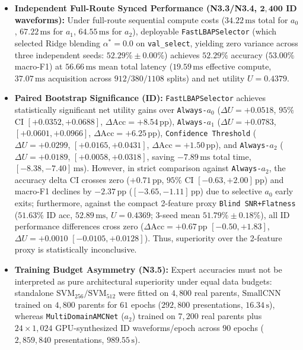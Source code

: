 \begin{itemize}
    \item \textbf{Independent Full-Route Synced Performance (N3.3/N3.4, $\mathbf{2{,}400}$ ID waveforms):} Under full-route sequential compute costs ($34.22\,\mathrm{ms}$ total for $a_0$, $67.22\,\mathrm{ms}$ for $a_1$, $64.55\,\mathrm{ms}$ for $a_2$), deployable \texttt{FastLBAPSelector} (which selected Ridge blending $\alpha^*=0.0$ on \texttt{val\_select}, yielding zero variance across three independent seeds: $52.29\% \pm 0.00\%$) achieves $\mathbf{52.29\%}$ accuracy ($53.00\%$ macro-F1) at $\mathbf{56.66\,\mathrm{ms}}$ mean total latency ($19.59\,\mathrm{ms}$ effective compute, $37.07\,\mathrm{ms}$ acquisition across $912/380/1108$ splits) and net utility $U = \mathbf{0.4379}$.
    \item \textbf{Paired Bootstrap Significance (ID):} \texttt{FastLBAPSelector} achieves statistically significant net utility gains over \texttt{Always-$a_0$} ($\Delta U = +0.0518$, $95\%$ CI $[+0.0352, +0.0688]$, $\Delta\mathrm{Acc} = +8.54\,\mathrm{pp}$), \texttt{Always-$a_1$} ($\Delta U = +0.0783$, $[+0.0601, +0.0966]$, $\Delta\mathrm{Acc} = +6.25\,\mathrm{pp}$), \texttt{Confidence Threshold} ($\Delta U = +0.0299$, $[+0.0165, +0.0431]$, $\Delta\mathrm{Acc} = +1.50\,\mathrm{pp}$), and \texttt{Always-$a_2$} ($\Delta U = +0.0189$, $[+0.0058, +0.0318]$, saving $-7.89\,\mathrm{ms}$ total time, $[-8.38, -7.40]\,\mathrm{ms}$). However, in strict comparison against \texttt{Always-$a_2$}, the accuracy delta CI crosses zero ($+0.71\,\mathrm{pp}$, $95\%$ CI $[-0.63, +2.00]\,\mathrm{pp}$) and macro-F1 declines by $-2.37\,\mathrm{pp}$ ($[-3.65, -1.11]\,\mathrm{pp}$) due to selective $a_0$ early exits; furthermore, against the compact 2-feature proxy \texttt{Blind SNR+Flatness} ($51.63\%$ ID acc, $52.89\,\mathrm{ms}$, $U = 0.4369$; 3-seed mean $51.79\% \pm 0.18\%$), all ID performance differences cross zero ($\Delta\mathrm{Acc} = +0.67\,\mathrm{pp}$ $[-0.50, +1.83]$, $\Delta U = +0.0010$ $[-0.0105, +0.0128]$). Thus, superiority over the 2-feature proxy is statistically inconclusive.
    \item \textbf{Training Budget Asymmetry (N3.5):} Expert accuracies must not be interpreted as pure architectural superiority under equal data budgets: standalone $\mathrm{SVM}_{256}/\mathrm{SVM}_{512}$ were fitted on $4{,}800$ real parents, $\mathrm{SmallCNN}$ trained on $4{,}800$ parents for $61$ epochs ($292{,}800$ presentations, $16.34\,\mathrm{s}$), whereas \texttt{MultiDomainAMCNet} ($a_2$) trained on $7{,}200$ real parents plus $24 \times 1{,}024$ GPU-synthesized ID waveforms/epoch across $90$ epochs ($2{,}859{,}840$ presentations, $989.55\,\mathrm{s}$).
\end{itemize}

